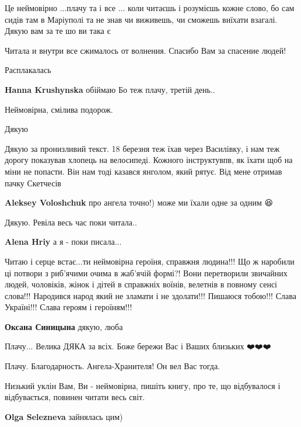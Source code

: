 Це неймовірно ...плачу та і все ... коли читаєшь і розумієшь кожне слово, бо
сам сидів там в Маріуполі та не знав чи виживешь, чи сможешь виїхати взагалі.
Дякую вам за те шо ви така є 🤗


Читала и внутри все сжималось от волнения. Спасибо Вам за спасение людей!🙏


Расплакалась

\begin{itemize} %
\textbf{Hanna Krushynska} обіймаю
Бо теж плачу, третій день..
\end{itemize} %


Неймовірна, смілива подорож.

Дякую


Дякую за пронизливий текст. 18 березня теж їхав через Василівку, і нам теж
дорогу показував хлопець на велосипеді. Кожного інструктувпв, як їхати щоб на
міни не попасти. Він нам тоді казався янголом, який рятує. Від мене отримав
пачку Скетчесів

\begin{itemize} %
\textbf{Aleksey Voloshchuk} про ангела точно!)
може ми їхали одне за одним 😆
\end{itemize} %


Дякую. Ревіла весь час поки читала..

\begin{itemize} %
\textbf{Alena Hriy} а я - поки писала...
\end{itemize} %


Читаю і серце встає...ти неймовірна героїня, справжня людина!!! Що ж наробили
ці потвори з риб'ячими очима в жаб'ячій формі?! Вони перетворили звичайних
людей, чоловіків, жінок і дітей в справжніх воїнів, велетнів в повному сенсі
слова!!! Народився народ який не зламати і не здолати!!! Пишаюся тобою!!! Слава
Україні!!! Слава героям і героїням!!!

\begin{itemize} %
\textbf{Оксана Синицына} дякую, люба 🌼😌
\end{itemize} %


Плачу... Велика ДЯКА за всіх. Боже бережи Вас і Ваших близьких ❤️❤️❤️


Плачу. Благодарность. Ангела-Хранителя! Он вел Вас тогда.


Низький уклін Вам, Ви - неймовірна, пишіть книгу, про те, що відбувалося і
відбувається, повинен читати весь світ.

\begin{itemize} %
\textbf{Olga Selezneva} зайнялась цим)
\end{itemize} %
